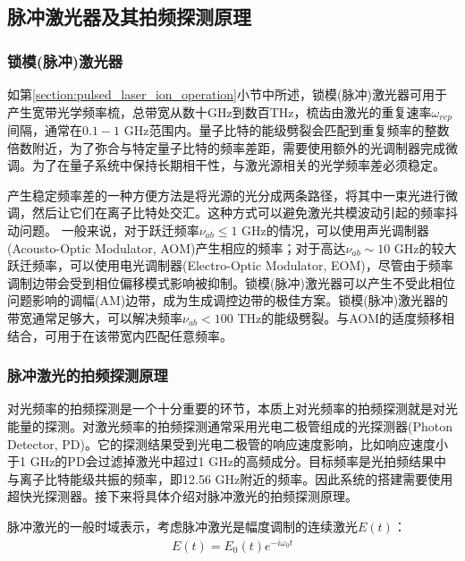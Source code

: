 \subsection[脉冲激光器及其拍频探测原理]{脉冲激光器及其拍频探测原理}
\subsubsection[锁模(脉冲)激光器]{锁模(脉冲)激光器}
如第\ref{section:pulsed_laser_ion_operation}小节中所述，锁模(脉冲)激光器可用于产生宽带光学频率梳，总带宽从数十GHz到数百THz，梳齿由激光的重复速率$\omega_{rep}$间隔，通常在$0.1-1 $ GHz范围内。量子比特的能级劈裂会匹配到重复频率的整数倍数附近，为了弥合与特定量子比特的频率差距，需要使用额外的光调制器完成微调\cite[]{Hayes_Matsukevich_Maunz_Hucul_Quraishi_Olmschenk_Campbell_Mizrahi_Senko_Monroe_2010}。为了在量子系统中保持长期相干性，与激光源相关的光学频率差必须稳定\cite[]{Stick_Hensinger_Olmschenk_Madsen_Schwab_Monroe_2006}。

产生稳定频率差的一种方便方法是将光源的光分成两条路径，将其中一束光进行微调，然后让它们在离子比特处交汇。这种方式可以避免激光共模波动引起的频率抖动问题\cite[]{Thomas_Hemmer_Ezekiel_Leiby_Picard_Willis_2002}。
一般来说，对于跃迁频率$\nu_{ab}\leq 1$ GHz的情况，可以使用声光调制器(Acousto-Optic Modulator, AOM)产生相应的频率；对于高达$\nu_{ab} \sim 10 $ GHz的较大跃迁频率，可以使用电光调制器(Electro-Optic Modulator, EOM)，尽管由于频率调制边带会受到相位偏移模式影响被抑制\cite[]{Lee_Blinov_Brickman_Deslauriers_Madsen_Miller_Moehring_Stick_Monroe_2003}。锁模(脉冲)激光器可以产生不受此相位问题影响的调幅(AM)边带，成为生成调控边带的极佳方案。锁模(脉冲)激光器的带宽通常足够大，可以解决频率$\nu_{ab} < 100 $ THz的能级劈裂。与AOM的适度频移相结合，可用于在该带宽内匹配任意频率。

\subsubsection[脉冲激光的拍频探测原理]{脉冲激光的拍频探测原理}
对光频率的拍频探测是一个十分重要的环节，本质上对光频率的拍频探测就是对光能量的探测。对激光频率的拍频探测通常采用光电二极管组成的光探测器(Photon Detector, PD)。它的探测结果受到光电二极管的响应速度影响，比如响应速度小于1 GHz的PD会过滤掉激光中超过1 GHz的高频成分。目标频率是光拍频结果中与离子比特能级共振的频率，即12.56 GHz附近的频率。因此系统的搭建需要使用超快光探测器。接下来将具体介绍对脉冲激光的拍频探测原理。

脉冲激光的一般时域表示，考虑脉冲激光是幅度调制的连续激光$E(t)$：
\begin{align}
    E(t)=E_0 (t) e^{-i\omega_0 t}
\end{align}

